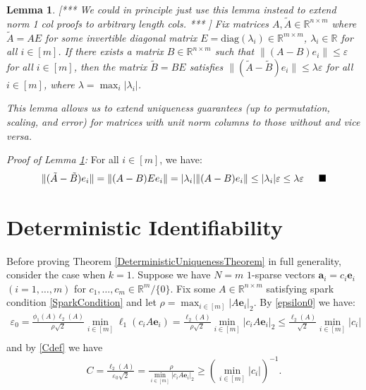 \documentclass[journal, onecolumn]{IEEEtran}
\newtheorem{lemma}{Lemma}
\begin{document}
\begin{lemma}\label{NormalizedDictionaryLemma}
[*** We could in principle just use this lemma instead to extend norm 1 col proofs to arbitrary length cols. *** ]
Fix matrices $A, \tilde{A} \in \mathbb{R}^{n \times m}$ where $\tilde{A} = AE$ for some invertible diagonal matrix $E = \text{diag}(\lambda_i) \in \mathbb{R}^{m \times m}$, $\lambda_i \in \mathbb{R}$ for all $i \in [m]$. If there exists a matrix $B \in \mathbb{R}^{n \times m}$ such that $\|(A - B)e_i\| \leq \varepsilon$ for all $i \in [m]$, then the matrix $\tilde{B} = BE$ satisfies $\|(\tilde{A} - \tilde{B})e_i\| \leq \lambda \varepsilon$ for all $i \in [m]$, where $\lambda = \max_i |\lambda_i|$.

This lemma allows us to extend uniqueness guarantees (up to permutation, scaling, and error) for matrices with unit norm columns to those without and vice versa. 
\end{lemma}

\emph{Proof of Lemma \ref{NormalizedDictionaryLemma}:} For all $i \in [m]$, we have:
\begin{align*}
\|(\tilde{A} - \tilde{B})e_i\| = \|(A-B)Ee_i\| = |\lambda_i| \|(A-B)e_i\| \leq |\lambda_i| \varepsilon \leq \lambda \varepsilon 
\indent \blacksquare
\end{align*}

 

\section{Deterministic Identifiability}\label{DUT}


Before proving Theorem \ref{DeterministicUniquenessTheorem} in full generality, consider the case when $k=1$. Suppose we have $N = m$ $1$-sparse vectors $\mathbf{a}_i = c_i\mathbf{e}_i$ $(i = 1, \ldots, m)$ for $c_1, \ldots, c_m \in \mathbb{R}^m/\{0\}$. Fix some $A \in \mathbb{R}^{n \times m}$ satisfying spark condition \eqref{SparkCondition} and let $\rho = \max_{i \in [m]} |A\mathbf{e}_i|_2$. By \eqref{epsilon0} we have:
\begin{align}
\varepsilon_0 
= \frac{ \phi_1(A) \ell_{2}(A) }{\rho \sqrt{2}} \min_{i \in [m]} \ell_1(c_iA\mathbf{e}_i) 
= \frac{\ell_2(A)}{ \rho \sqrt{2}} \min_{i \in [m]}|c_iA\mathbf{e}_i|_2
\leq \frac{\ell_2(A)}{ \sqrt{2}} \min_{i \in [m]}|c_i| \\
\end{align}
%
and by \eqref{Cdef} we have
\begin{align}
C = \frac{\ell_{2}(A)}{ \varepsilon_0 \sqrt{2}} = \frac{ \rho }{ \min_{i \in [m]} |c_iA\mathbf{e}_i|_2 }
\geq (\min_{i \in [m]} |c_i|)^{-1}. \\
\end{align} 
\end{document}
